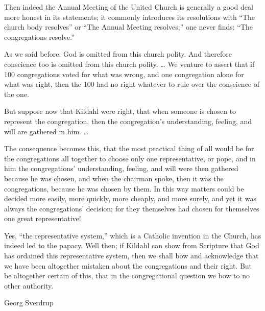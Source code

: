 Then indeed the Annual Meeting of the United Church is generally a good deal more honest in its statements; it commonly introduces its resolutions with “The church body resolves” or “The Annual Meeting resolves;” one never finds: “The congregations resolve.”

As we said before: God is omitted from this church polity. And therefore conscience too is omitted from this church polity. … We venture to assert that if 100 congregations voted for what was wrong, and one congregation alone for what was right, then the 100 had no right whatever to rule over the conscience of the one.

But suppose now that Kildahl were right, that when someone is chosen to represent the congregation, then the congregation’s understanding, feeling, and will are gathered in him. …

The consequence becomes this, that the most practical thing of all would be for the congregations all together to choose only one representative, or pope, and in him the congregations’ understanding, feeling, and will were then gathered because he was chosen, and when the chairman spoke, then it was the congregations, because he was chosen by them. In this way matters could be decided more easily, more quickly, more cheaply, and more surely, and yet it was always the congregations’ decision; for they themselves had chosen for themselves one great representative!

Yes, “the representative system,” which is a Catholic invention in the Church, has indeed led to the papacy. Well then; if Kildahl can show from Scripture that God has ordained this representative system, then we shall bow and acknowledge that we have been altogether mistaken about the congregations and their right. But be altogether certain of this, that in the congregational question we bow to no other authority.

Georg Sverdrup
